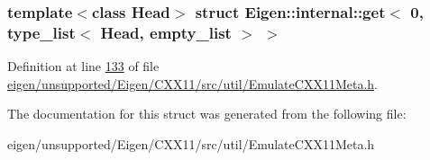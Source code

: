 \subsubsection*{template$<$class Head$>$\newline
struct Eigen\+::internal\+::get$<$ 0, type\+\_\+list$<$ Head, empty\+\_\+list $>$ $>$}



Definition at line \hyperlink{eigen_2unsupported_2_eigen_2_c_x_x11_2src_2util_2_emulate_c_x_x11_meta_8h_source_l00133}{133} of file \hyperlink{eigen_2unsupported_2_eigen_2_c_x_x11_2src_2util_2_emulate_c_x_x11_meta_8h_source}{eigen/unsupported/\+Eigen/\+C\+X\+X11/src/util/\+Emulate\+C\+X\+X11\+Meta.\+h}.



The documentation for this struct was generated from the following file\+:\begin{DoxyCompactItemize}
\item 
eigen/unsupported/\+Eigen/\+C\+X\+X11/src/util/\+Emulate\+C\+X\+X11\+Meta.\+h\end{DoxyCompactItemize}
